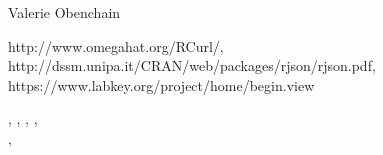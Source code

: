 \begin{Author}\relax
Valerie Obenchain
\end{Author}
\begin{References}\relax
http://www.omegahat.org/RCurl/,\\
http://dssm.unipa.it/CRAN/web/packages/rjson/rjson.pdf,\\
https://www.labkey.org/project/home/begin.view
\end{References}
\begin{SeeAlso}\relax
{}, , , 
, \\
, 
\end{SeeAlso}


